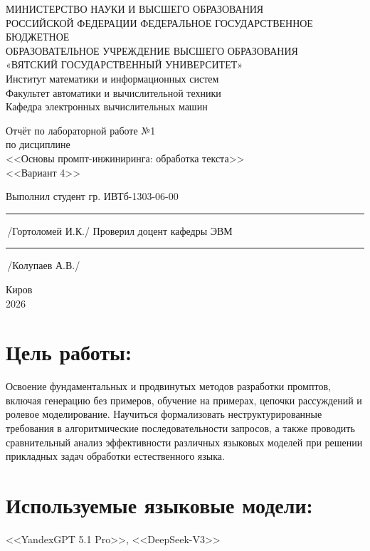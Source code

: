 \documentclass[oneside,a4paper,14pt]{extarticle} %
\begin{document}
	\newpage\thispagestyle{empty}
	\begin{center}
		МИНИСТЕРСТВО НАУКИ И ВЫСШЕГО ОБРАЗОВАНИЯ\\
			РОССИЙСКОЙ ФЕДЕРАЦИИ
			ФЕДЕРАЛЬНОЕ ГОСУДАРСТВЕННОЕ БЮДЖЕТНОЕ\\
			ОБРАЗОВАТЕЛЬНОЕ
			УЧРЕЖДЕНИЕ ВЫСШЕГО ОБРАЗОВАНИЯ\\
			«ВЯТСКИЙ ГОСУДАРСТВЕННЫЙ УНИВЕРСИТЕТ»\\
			Институт математики и информационных систем\\
			Факультет автоматики и вычислительной техники\\
			Кафедра электронных вычислительных машин
	\end{center}
	\vspace{20mm}

	\begin{center}
		Отчёт по лабораторной работе №1\\
		по дисциплине\\
		<<Основы промпт-инжиниринга: обработка текста>>\\
		<<Вариант 4>>\\
	\end{center}
	\vspace{48mm}

	\noindent
	Выполнил студент гр. ИВТб-1303-06-00 \hfill \rule[-0,5mm]{30mm}{0.15mm}\,/Гортоломей И.К./
	\newline
	Проверил доцент кафедры ЭВМ \hfill \rule[-0,5mm]{30mm}{0.15mm}\,/Колупаев А.В./

	\vfill
	\begin{center}
		Киров\\
		2026
	\end{center}

	\newpage
	\thispagestyle{empty}

	\section*{Цель работы:} Освоение фундаментальных и продвинутых методов разработки промптов, включая генерацию без примеров, обучение на примерах, цепочки рассуждений и ролевое моделирование. Научиться формализовать неструктурированные требования в алгоритмические последовательности запросов, а также проводить сравнительный анализ эффективности различных языковых моделей при решении прикладных задач обработки естественного языка.
	\section*{Используемые языковые модели:} <<YandexGPT 5.1 Pro>>, <<DeepSeek-V3>>
	
	\newpage
	
	
	
	
	\newpage
	
\end{document}
